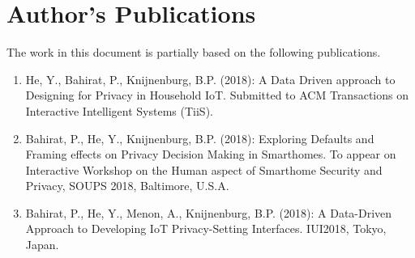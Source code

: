 \chapter*{Author's Publications}
\noindent The work in this document is partially based on the following publications.
\begin{enumerate}
	\item He, Y., Bahirat, P., Knijnenburg, B.P. (2018): A Data Driven approach to Designing for Privacy in Household IoT. Submitted to ACM Transactions on Interactive Intelligent Systems (TiiS).
	\item Bahirat, P., He, Y., Knijnenburg, B.P. (2018): Exploring Defaults and Framing effects on Privacy Decision Making in Smarthomes.  To appear on Interactive Workshop on the Human aspect of Smarthome Security and Privacy, SOUPS 2018, Baltimore, U.S.A.
	\item Bahirat, P., He, Y., Menon, A., Knijnenburg, B.P. (2018): A Data-Driven Approach to Developing IoT Privacy-Setting Interfaces. IUI2018, Tokyo, Japan.
%	
\end{enumerate}